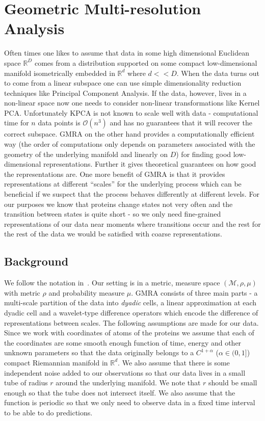 \documentclass{article}
\begin{document}
\section{Geometric Multi-resolution Analysis}
Often times one likes to assume that data in some high dimensional Euclidean space $\mathbb{R}^D$ comes from a distribution supported on some compact low-dimensional manifold isometrically embedded in $\mathbb{R}^d$ where $d << D$. When the data turns out to come from a linear subspace one can use simple dimensionality reduction techniques like Principal Component Analysis. If the data, however, lives in a non-linear space now one needs to consider non-linear transformations like Kernel PCA. Unfortunately KPCA is not known to scale well with data - computational time for $n$ data points is $\mathcal{O}(n^3)$ and has no guarantees that it will recover the correct subspace. GMRA on the other hand provides a computationally efficient way (the order of computations only depends on parameters associated with the geometry of the underlying manifold and linearly on $D$) for finding good low-dimensional representations. Further it gives theoretical guarantees on how good the representations are. One more benefit of GMRA is that it provides representations at different ``scales'' for the underlying process which can be beneficial if we suspect that the process behaves differently at different levels. For our purposes we know that proteins change states not very often and the transition between states is quite short - so we only need fine-grained representations of our data near moments where transitions occur and the rest for the rest of the data we would be satisfied with coarse representations.
\subsection{Background}
We follow the notation in~\cite{allard2012multi}. Our setting is in a metric, measure space $\left(\mathcal{M},\rho, \mu\right)$ with metric $\rho$ and probability measure $\mu$. GMRA consists of three main parts - a multi-scale partition of the data into \textit{dyadic} cells, a linear approximation at each dyadic cell and a wavelet-type difference operators which encode the difference of representations between scales. The following assumptions are made for our data. Since we work with coordinates of atoms of the proteins we assume that each of the coordinates are some smooth enough function of time, energy and other unknown parameters so that the data originally belongs to a $C^{1+\alpha}$ ($\alpha \in (0,1]$) compact Riemannian manifold in $\mathbb{R}^d$. We also assume that there is some independent noise added to our observations so that our data lives in a small tube of radius $r$ around the underlying manifold. We note that $r$ should be small enough so that the tube does not intersect itself. We also assume that the function is periodic so that we only need to observe data in a fixed time interval to be able to do predictions.
\end{document}
